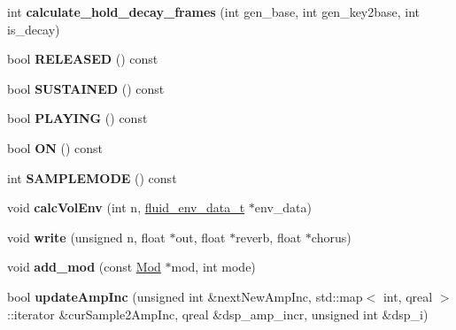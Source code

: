 \begin{DoxyCompactItemize}
int {\bfseries calculate\+\_\+hold\+\_\+decay\+\_\+frames} (int gen\+\_\+base, int gen\+\_\+key2base, int is\+\_\+decay)
\item 
\mbox{\label{class_fluid_s_1_1_voice_a57fe4e2f6fffa022b8e248ebba22d276}} 
bool {\bfseries R\+E\+L\+E\+A\+S\+ED} () const
\item 
\mbox{\label{class_fluid_s_1_1_voice_ae940776dd639b827b795370ee476dd87}} 
bool {\bfseries S\+U\+S\+T\+A\+I\+N\+ED} () const
\item 
\mbox{\label{class_fluid_s_1_1_voice_a95f2782fd35429cedf1b35079d8c25d2}} 
bool {\bfseries P\+L\+A\+Y\+I\+NG} () const
\item 
\mbox{\label{class_fluid_s_1_1_voice_abdd2f7ea1c3d1c7eec5a352ecd3c5c6c}} 
bool {\bfseries ON} () const
\item 
\mbox{\label{class_fluid_s_1_1_voice_adbcb814bc16933850aa62ac143d26ec8}} 
int {\bfseries S\+A\+M\+P\+L\+E\+M\+O\+DE} () const
\item 
\mbox{\label{class_fluid_s_1_1_voice_a0a1353697aa093972e9c94423bfb8a5d}} 
void {\bfseries calc\+Vol\+Env} (int n, \hyperlink{struct_fluid_s_1_1fluid__env__data__t}{fluid\+\_\+env\+\_\+data\+\_\+t} $\ast$env\+\_\+data)
\item 
\mbox{\label{class_fluid_s_1_1_voice_a297618a723d834b7036a931f7f05b037}} 
void {\bfseries write} (unsigned n, float $\ast$out, float $\ast$reverb, float $\ast$chorus)
\item 
\mbox{\label{class_fluid_s_1_1_voice_a2dccce3950c858362fabbf34922a7190}} 
void {\bfseries add\+\_\+mod} (const \hyperlink{struct_fluid_s_1_1_mod}{Mod} $\ast$mod, int mode)
\item 
\mbox{\label{class_fluid_s_1_1_voice_a2d83337397921d9738a50d9e07eef0a8}} 
bool {\bfseries update\+Amp\+Inc} (unsigned int \&next\+New\+Amp\+Inc, std\+::map$<$ int, qreal $>$\+::iterator \&cur\+Sample2\+Amp\+Inc, qreal \&dsp\+\_\+amp\+\_\+incr, unsigned int \&dsp\+\_\+i)

\end{DoxyCompactItemize}
